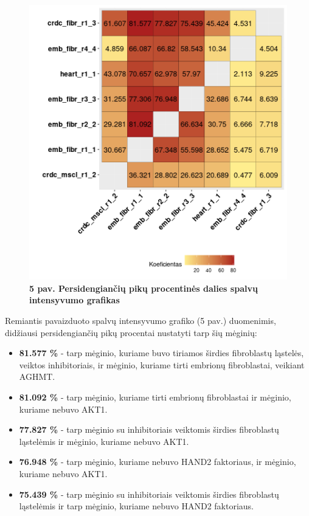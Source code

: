 \documentclass[12pt]{article}
\begin{document}
\begin{figure}[htb]
    \begin{center}
        \includegraphics[width=0.6\linewidth]{../Figures/peak_overlaps.png}
        \vspace{-2\baselineskip}
        \caption*{\small\textbf{5 pav. Persidengiančių pikų procentinės
                                dalies spalvų intensyvumo grafikas}}
    \end{center}
\end{figure}

Remiantis pavaizduoto spalvų intensyvumo grafiko (5 pav.) duomenimis, didžiausi
persidengiančių pikų procentai nustatyti tarp šių mėginių:

\begin{itemize}
    \item \textbf{81.577 \%} - tarp mėginio, kuriame buvo tiriamos širdies
        fibroblastų ląstelės, veiktos inhibitoriais, ir mėginio, kuriame
        tirti embrionų fibroblastai, veikiant AGHMT.
    \item \textbf{81.092 \%} - tarp mėginio, kuriame tirti embrionų
        fibroblastai ir mėginio, kuriame nebuvo AKT1.
    \item \textbf{77.827 \%} - tarp mėginio su inhibitoriais veiktomis
        širdies fibroblastų ląstelėmis ir mėginio, kuriame nebuvo AKT1.
    \item \textbf{76.948 \%} - tarp mėginio, kuriame nebuvo HAND2 faktoriaus,
        ir mėginio, kuriame nebuvo AKT1.
    \item \textbf{75.439 \%} - tarp mėginio su inhibitoriais veiktomis
        širdies fibroblastų ląstelėmis ir tarp mėginio, kuriame nebuvo HAND2
        faktoriaus.
  \end{itemize}
\end{document}
